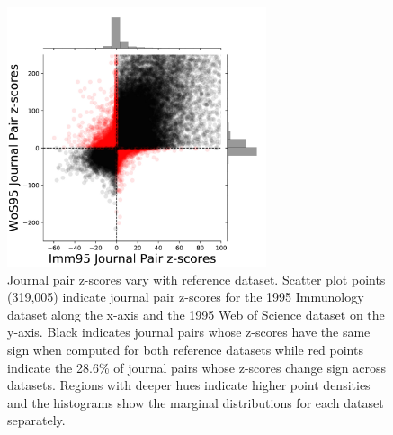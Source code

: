 \documentclass[NETN]{stjour}
\begin{document}
\begin{figure}%
\centering
\includegraphics[width=3in]{fig2_scatter_z_scores_flattened.pdf}     %
\caption{Journal pair z-scores vary with reference dataset. Scatter plot points (319,005) indicate journal pair z-scores for the 1995 Immunology dataset along the x-axis and the 1995 Web of Science dataset on the y-axis. Black indicates journal pairs whose z-scores have the same sign when computed for both reference datasets while red points indicate the 28.6\% of journal pairs whose z-scores change sign across datasets. Regions with deeper hues indicate higher point densities and the histograms show the marginal distributions for each dataset separately.}
\label{fig:scatter}
\end{figure}

\end{document}
